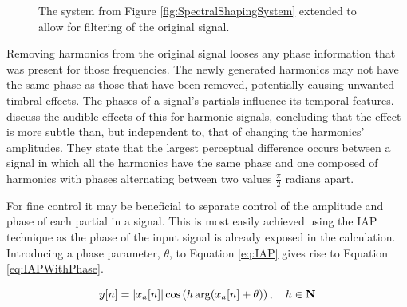 \begin{figure}[h!]
			\caption{The system from Figure \ref{fig:SpectralShapingSystem} extended to allow for filtering of
				 the original signal.}
			\label{fig:SuperpositionSystem}
		\end{figure}

		Removing harmonics from the original signal looses any phase information that was present for those
		frequencies. The newly generated harmonics may not have the same phase as those that have been removed,
		potentially causing unwanted timbral effects. The phases of a signal's partials influence its temporal
		features. \citet{plomp1969effect} discuss the audible effects of this for harmonic signals, concluding that
		the effect is more subtle than, but independent to, that of changing the harmonics' amplitudes. They state
		that the largest perceptual difference occurs between a signal in which all the harmonics have the same
		phase and one composed of harmonics with phases alternating between two values $\frac{\pi}{2}$ radians
		apart.

		For fine control it may be beneficial to separate control of the amplitude and phase of each partial in a
		signal. This is most easily achieved using the IAP technique as the phase of the input signal is already
		exposed in the calculation. Introducing a phase parameter, $\theta$, to Equation \ref{eq:IAP} gives rise to
		Equation \ref{eq:IAPWithPhase}.

		\begin{equation}
			y[n] = \left|x_{a}[n]\right| \cos \left( h\arg(x_{a}[n] + \theta) \right), \quad h \in \textbf{N}
			\label{eq:IAPWithPhase}
		\end{equation}

